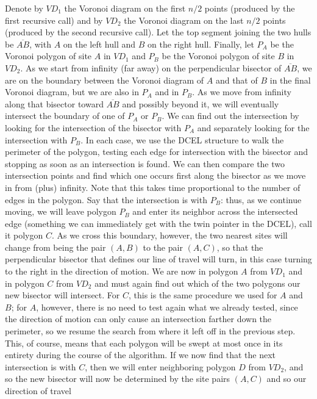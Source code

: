 \documentclass[11pt]{article}
\begin{document}
Denote by $VD_1$ the Voronoi diagram on the first $n/2$ points (produced
by the first recursive call) and by $VD_2$ the Voronoi diagram on the
last $n/2$ points (produced by the second recursive call).  Let
the top segment joining the two hulls be $\overline{AB}$, with $A$
on the left hull and $B$ on the right hull.  Finally, let $P_A$ be the
Voronoi polygon of site $A$ in $VD_1$ and $P_B$ be the Voronoi polygon of
site $B$ in $VD_2$.   As we start from infinity (far away) on the perpendicular
bisector of $\overline{AB}$, we are on the boundary between the Voronoi diagram
of $A$ and that of $B$ in the final Voronoi diagram, but we are also in $P_A$
and in $P_B$.  As we move from infinity along that bisector toward
$\overline{AB}$ and possibly beyond it, we will eventually intersect the
boundary of one of $P_A$ or $P_B$.  We can find out the intersection by looking
for the intersection of the bisector with $P_A$ and separately looking for the
intersection with $P_B$.  In each case, we use the DCEL structure to walk the
perimeter of the polygon, testing each edge for intersection with the bisector
and stopping as soon as an intersection is found.  We can then compare the
two intersection points and find which one occurs first along the bisector as
we move in from (plus) infinity.  Note that this takes time proportional to
the number of edges in the polygon.  Say that the intersection is with $P_B$:
thus, as we continue moving, we will leave polygon $P_B$ and enter its neighbor
across the intersected edge (something we can immediately get with the twin
pointer in the DCEL), call it polygon $C$.  As we cross this boundary, however,
the two nearest sites will change from being the pair $(A,B)$ to the pair
$(A,C)$, so that the perpendicular bisector that defines our line of travel
will turn, in this case turning to the right in the direction of motion.
We are now in polygon $A$ from $VD_1$ and in polygon $C$ from $VD_2$ and must
again find out which of the two polygons our new bisector will intersect.
For $C$, this is the same procedure we used for $A$ and $B$; for $A$, however,
there is no need to test again what we already tested, since the direction of
motion can only cause an intersection farther down the perimeter, so we
resume the search from where it left off in the previous step.  This, of course,
means that each polygon will be swept at most once in its entirety during the
course of the algorithm.  If we now find that the next intersection is with $C$,
then we will enter neighboring polygon $D$ from $VD_2$, and so the new bisector
will now be determined by the site pairs $(A,C)$ and so our direction of travel
\end{document}
